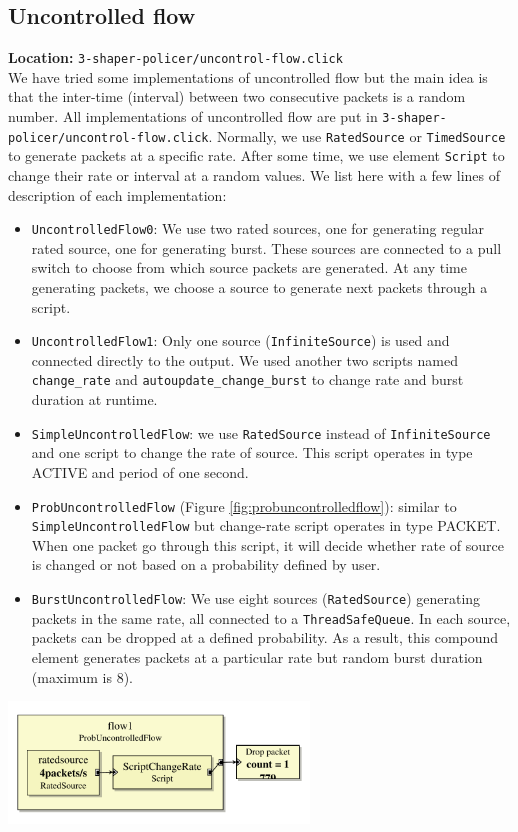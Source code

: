 \documentclass[a4paper]{article}
\begin{document}
  \subsection{Uncontrolled flow}
  \textbf{Location:} \texttt{3-shaper-policer/uncontrol-flow.click} \\
  We have tried some implementations of uncontrolled flow but the main idea is that the inter-time (interval) between two consecutive packets is a random
  number. All implementations of uncontrolled flow are put in \texttt{3-shaper-policer/uncontrol-flow.click}. Normally, we use \texttt{RatedSource} or \texttt{TimedSource} to generate packets at a specific rate. After some time, we use element \texttt{Script} to change their rate or interval at a random values. We list here with a few lines of description of each implementation:
  \begin{itemize}
  	\item \texttt{UncontrolledFlow0}: We use two rated sources, one for generating regular rated source, one for generating burst. These sources are connected to a pull switch to choose from which source packets are generated. At any time generating packets, we choose a source to generate next packets through a script. 
  	\item \texttt{UncontrolledFlow1}: Only one source (\texttt{InfiniteSource}) is used and connected directly to the output. We used another two scripts named \texttt{change\_rate} and \texttt{autoupdate\_change\_burst} to change rate and burst duration at runtime.
  	\item \texttt{SimpleUncontrolledFlow}: we use \texttt{RatedSource} instead of \texttt{InfiniteSource} and one script to change the rate of source. This script operates in type ACTIVE and period of one second.
  	\item \texttt{ProbUncontrolledFlow} (Figure \ref{fig:probuncontrolledflow}): similar to \texttt{SimpleUncontrolledFlow} but change-rate script operates in type PACKET. When one packet go through this script, it will decide whether rate of source is changed or not based on a probability defined by user.
  	\item \texttt{BurstUncontrolledFlow}: We use eight sources (\texttt{RatedSource}) generating packets in the same rate, all connected to a \texttt{ThreadSafeQueue}. In each source, packets can be dropped at a defined probability. As a result, this compound element generates packets at a particular rate but random burst duration (maximum is 8). 
  \end{itemize}
  \begin{center}
	\includegraphics[width=0.60\textwidth]{probuncontrolledflow.pdf}
	\label{fig:probuncontrolledflow}
  \end{center}
  
\end{document}
